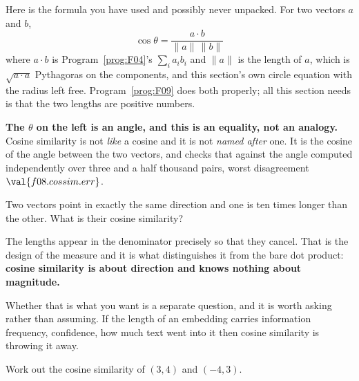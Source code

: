 \begin{fr}
Here is the formula you have used and possibly never unpacked. For two
vectors $a$ and $b$,
\[ \cos\theta = \frac{a \cdot b}{\lVert a \rVert\, \lVert b \rVert} \]
where $a \cdot b$ is Program~\ref{prog:F04}'s $\sum_i a_i b_i$ and
$\lVert a \rVert$ is the length of $a$, which is $\sqrt{a \cdot a}$ \dash{}
Pythagoras on the components, and this section's own circle equation with the
radius left free. Program~\ref{prog:F09} does both properly; all this section
needs is that the two lengths are positive numbers.

\textbf{The $\theta$ on the left is an angle, and this is an equality, not an
analogy.} Cosine similarity is not \emph{like} a cosine and it is not
\emph{named after} one. It is the cosine of the angle between the two vectors,
and  checks that against the angle computed
independently over three and a half thousand pairs, worst disagreement
$\val{f08.cossim.err}$.

Two vectors point in exactly the same direction and one is ten times longer
than the other. What is their cosine similarity?
\nextframe
\end{fr}

\begin{fr}
The lengths appear in the denominator precisely so that they cancel. That is
the design of the measure and it is what distinguishes it from the bare dot
product: \textbf{cosine similarity is about direction and knows nothing about
magnitude.}

Whether that is what you want is a separate question, and it is worth asking
rather than assuming. If the length of an embedding carries information
\dash{} frequency, confidence, how much text went into it \dash{} then cosine
similarity is throwing it away.

Work out the cosine similarity of $(3, 4)$ and $(-4, 3)$.
\nextframe
\end{fr}

